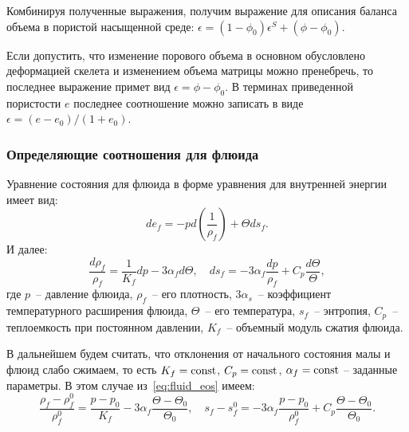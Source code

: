 Комбинируя полученные выражения, получим выражение для описания
баланса объема в пористой насыщенной среде:
%
\(
\epsilon = (1-\phi_0)\epsilon^S + (\phi-\phi_0).
\)
%

Если допустить, что изменение порового объема в основном обусловлено
деформацией скелета и изменением объема матрицы можно пренебречь, то
последнее выражение примет вид 
%
$\epsilon = \phi-\phi_0$.
В терминах приведенной пористости $e$ последнее соотношение можно
записать в виде 
$\epsilon = (e - e_0)/(1 + e_0)$.


\subsubsection{Определяющие соотношения для флюида}


Уравнение состояния для флюида в форме уравнения для внутренней энергии  имеет вид:
%
\begin{equation*}%
de_f = -p d\left(\frac{1}{\rho_f}\right) + \Theta d s_f.
\end{equation*}
%
И далее:
%
\begin{equation}
\label{eq:fluid_eos}
\frac{d\rho_f}{\rho_f} = \frac{1}{K_f} dp - 3\alpha_f d\Theta,\quad ds_f = -3\alpha_f \frac{dp}{\rho_f} + C_p\frac{d\Theta}{\Theta},
\end{equation}
%
где $p$~-- давление флюида, $\rho_f$~-- его плотность, 
$3\alpha_s$~-- коэффициент температурного расширения флюида, 
$\Theta$~-- его температура, $s_f$~-- энтропия, $C_p$~-- теплоемкость при постоянном давлении, $K_f$~-- объемный модуль сжатия флюида.

В дальнейшем будем считать, что отклонения от начального состояния малы и  флюид слабо сжимаем, то есть
%
$K_f = \operatorname*{{const}}$, $C_p = \operatorname*{{const}}$, $\alpha_f = \operatorname*{{const}}$
-- заданные параметры.
%
В этом случае из~\eqref{eq:fluid_eos} имеем:
%
\[
\frac{\rho_f - \rho_f^0}{\rho_f^0} = \frac{p-p_0}{K_f} - 3\alpha_f \frac{\Theta - \Theta_0}{\Theta_0},\quad
s_f - s_f^0 = -3\alpha_f\frac{p-p_0}{\rho_f^0}  + C_p\frac{\Theta - \Theta_0}{\Theta_0}.
\]
%


